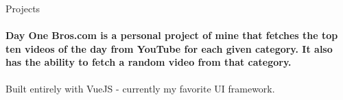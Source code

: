 \documentclass{material-resume}
\begin{document}
\begin{minipage}[t]{0.64\textwidth}
\begin{materialbox}{Projects}
        	\href{https://dayonebros.com}{} \\
        	\paragraph{Day One Bros.com is a personal project of mine that fetches the top ten videos of the day from YouTube for each given category. It also has the ability to fetch a random video from that category.}
        	\begin{tightemize}
        		\item Built entirely with VueJS - currently my favorite UI framework.
        	\end{tightemize}
        	\sectionsep
    	\end{materialbox}
    \end{minipage} 
\end{document}
